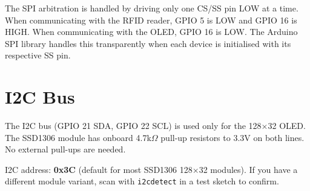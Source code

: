 The SPI arbitration is handled by driving only one CS/SS pin LOW at a time. When communicating with the RFID reader, GPIO 5 is LOW and GPIO 16 is HIGH. When communicating with the OLED, GPIO 16 is LOW. The Arduino SPI library handles this transparently when each device is initialised with its respective SS pin.

\section{I2C Bus}

The I2C bus (GPIO 21 SDA, GPIO 22 SCL) is used only for the 128$\times$32 OLED. The SSD1306 module has onboard 4.7k$\Omega$ pull-up resistors to 3.3V on both lines. No external pull-ups are needed.

I2C address: \textbf{0x3C} (default for most SSD1306 128$\times$32 modules). If you have a different module variant, scan with \texttt{i2cdetect} in a test sketch to confirm.
